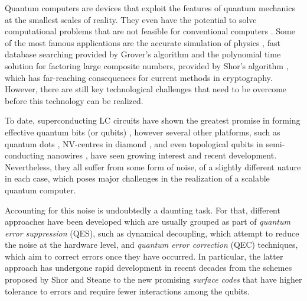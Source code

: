 Quantum computers are devices that exploit the features of quantum mechanics at
the smallest scales of reality. They even have the potential to solve
computational problems that are not feasible for conventional computers
\cite{nielsen_chuang_2010}. Some of the most famous applications are the
accurate simulation of physics \cite{feynman82_simul_physic_with_comput}, fast
database searching provided by Grover's algorithm \cite{Grover_1996} and the
polynomial time solution for factoring large composite numbers, provided by
Shor's algorithm \cite{Shor_1997}, which has far-reaching consequences for
current methods in cryptography. However, there are still key technological
challenges that need to be overcome before this technology can be realized.

To date, superconducting LC circuits have shown the greatest promise in forming
effective quantum bits (or qubits) \cite{Rol_2019}
\cite{barends14_super_quant_circuit_at_surfac}, however several other platforms,
such as quantum dots \cite{huang19_fidel_bench_two_qubit_gates_silic}
\cite{Lawrie_2020}, NV-centres in diamond \cite{Taminiau_2014}, and even
topological qubits in semi-conducting nanowires \cite{Mourik_2012}, have seen
growing interest and recent development. Nevertheless, they all suffer from some
form of noise, of a slightly different nature in each case, which poses
major challenges in the realization of a scalable quantum computer.

Accounting for this noise is undoubtedly a daunting task. For that, different
approaches have been developed which are usually grouped as part of
\textit{quantum error suppression} (QES), such as dynamical decoupling, which
attempt to reduce the noise at the hardware level, and \textit{quantum error
  correction} (QEC) techniques, which aim to correct errors once they have
occurred. In particular, the latter approach has undergone rapid development in
recent decades from the schemes proposed by Shor \cite{Shor_1995_QEC} and Steane
\cite{Steane_1996_QEC} to the new promising \textit{surface codes}
\cite{fowler12_surfac_codes} that have higher tolerance to errors and require
fewer interactions among the qubits.


